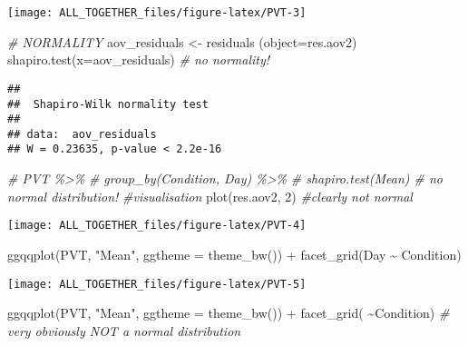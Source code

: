 \documentclass[
]{article}
\newenvironment{Shaded}{\begin{snugshade}}{\end{snugshade}}
\newcommand{\AttributeTok}[1]{\textcolor[rgb]{0.77,0.63,0.00}{#1}}
\newcommand{\CommentTok}[1]{\textcolor[rgb]{0.56,0.35,0.01}{\textit{#1}}}
\newcommand{\DecValTok}[1]{\textcolor[rgb]{0.00,0.00,0.81}{#1}}
\newcommand{\FunctionTok}[1]{\textcolor[rgb]{0.00,0.00,0.00}{#1}}
\newcommand{\NormalTok}[1]{#1}
\newcommand{\OtherTok}[1]{\textcolor[rgb]{0.56,0.35,0.01}{#1}}
\newcommand{\SpecialCharTok}[1]{\textcolor[rgb]{0.00,0.00,0.00}{#1}}
\newcommand{\StringTok}[1]{\textcolor[rgb]{0.31,0.60,0.02}{#1}}
\begin{document}
\texttt{[image: ALL\_TOGETHER\_files/figure-latex/PVT-3]}

\begin{Shaded}
\begin{Highlighting}[]
\CommentTok{\# NORMALITY}
\NormalTok{aov\_residuals }\OtherTok{\textless{}{-}} \FunctionTok{residuals}\NormalTok{ (}\AttributeTok{object=}\NormalTok{res.aov2)}
\FunctionTok{shapiro.test}\NormalTok{(}\AttributeTok{x=}\NormalTok{aov\_residuals) }\CommentTok{\# no normality! }
\end{Highlighting}
\end{Shaded}

\begin{verbatim}
## 
##  Shapiro-Wilk normality test
## 
## data:  aov_residuals
## W = 0.23635, p-value < 2.2e-16
\end{verbatim}

\begin{Shaded}
\begin{Highlighting}[]
\CommentTok{\# PVT \%\textgreater{}\%}
\CommentTok{\#   group\_by(Condition, Day) \%\textgreater{}\%}
\CommentTok{\#   shapiro.test(Mean) \# no normal distribution!}
\CommentTok{\#visualisation}
\FunctionTok{plot}\NormalTok{(res.aov2, }\DecValTok{2}\NormalTok{) }\CommentTok{\#clearly not normal}
\end{Highlighting}
\end{Shaded}

\texttt{[image: ALL\_TOGETHER\_files/figure-latex/PVT-4]}

\begin{Shaded}
\begin{Highlighting}[]
\FunctionTok{ggqqplot}\NormalTok{(PVT, }\StringTok{"Mean"}\NormalTok{, }\AttributeTok{ggtheme =} \FunctionTok{theme\_bw}\NormalTok{()) }\SpecialCharTok{+}
  \FunctionTok{facet\_grid}\NormalTok{(Day }\SpecialCharTok{\textasciitilde{}}\NormalTok{ Condition)}
\end{Highlighting}
\end{Shaded}

\texttt{[image: ALL\_TOGETHER\_files/figure-latex/PVT-5]}

\begin{Shaded}
\begin{Highlighting}[]
\FunctionTok{ggqqplot}\NormalTok{(PVT, }\StringTok{"Mean"}\NormalTok{, }\AttributeTok{ggtheme =} \FunctionTok{theme\_bw}\NormalTok{()) }\SpecialCharTok{+}
  \FunctionTok{facet\_grid}\NormalTok{( }\SpecialCharTok{\textasciitilde{}}\NormalTok{Condition) }\CommentTok{\#  very obviously NOT a normal distribution}
\end{Highlighting}
\end{Shaded}
\end{document}
